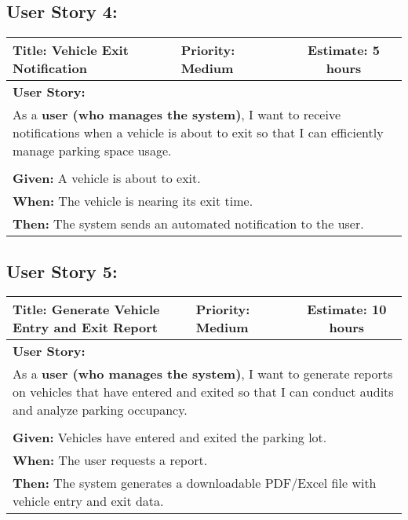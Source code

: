 \newpage

\subsection{User Story 4:}
\begin{table}[h]
    \centering
    \begin{tabular}{|p{7cm}|p{4cm}|c|}
        \hline
        \rowcolor{lightblue}
        \textbf{Title: Vehicle Exit Notification} & \textbf{Priority: Medium} & \textbf{Estimate: 5 hours} \\
        \hline
        \multicolumn{3}{|l|}{\textbf{User Story:}} \\
        \multicolumn{3}{|p{15cm}|}{As a \textbf{user (who manages the system)}, I want to receive notifications when a vehicle is about to exit so that I can efficiently manage parking space usage.} \\
        \hline
        \rowcolor{lightblue}
        \multicolumn{3}{|c|}{\textbf{Acceptance Criteria:}} \\
        \hline
        \multicolumn{3}{|l|}{\textbf{Given:} A vehicle is about to exit.} \\
        \multicolumn{3}{|l|}{\textbf{When:} The vehicle is nearing its exit time.} \\
        \multicolumn{3}{|l|}{\textbf{Then:} The system sends an automated notification to the user.} \\
        \hline
    \end{tabular}
\end{table}

\subsection{User Story 5:}
\begin{table}[h]
    \centering
    \begin{tabular}{|p{7cm}|p{4cm}|c|}
        \hline
        \rowcolor{lightblue}
        \textbf{Title: Generate Vehicle Entry and Exit Report} & \textbf{Priority: Medium} & \textbf{Estimate: 10 hours} \\
        \hline
        \multicolumn{3}{|l|}{\textbf{User Story:}} \\
        \multicolumn{3}{|p{15cm}|}{As a \textbf{user (who manages the system)}, I want to generate reports on vehicles that have entered and exited so that I can conduct audits and analyze parking occupancy.} \\
        \hline
        \rowcolor{lightblue}
        \multicolumn{3}{|c|}{\textbf{Acceptance Criteria:}} \\
        \hline
        \multicolumn{3}{|l|}{\textbf{Given:} Vehicles have entered and exited the parking lot.} \\
        \multicolumn{3}{|l|}{\textbf{When:} The user requests a report.} \\
        \multicolumn{3}{|l|}{\textbf{Then:} The system generates a downloadable PDF/Excel file with vehicle entry and exit data.} \\
        \hline
    \end{tabular}
\end{table}

